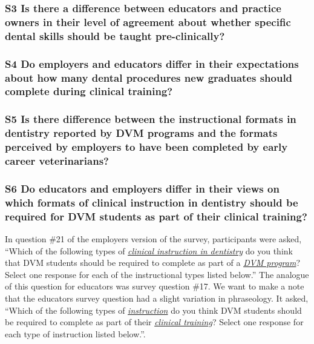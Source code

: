 \documentclass[
  11pt,
  letterpaper,
  DIV=11,
  numbers=noendperiod]{scrartcl}
\begin{document}
\subsubsection{S3 Is there a difference between educators and practice
owners in their level of agreement about whether specific dental skills
should be taught
pre-clinically?}\label{s3-is-there-a-difference-between-educators-and-practice-owners-in-their-level-of-agreement-about-whether-specific-dental-skills-should-be-taught-pre-clinically}

\subsubsection{S4 Do employers and educators differ in their
expectations about how many dental procedures new graduates should
complete during clinical
training?}\label{s4-do-employers-and-educators-differ-in-their-expectations-about-how-many-dental-procedures-new-graduates-should-complete-during-clinical-training}

\subsubsection{S5 Is there difference between the instructional formats
in dentistry reported by DVM programs and the formats perceived by
employers to have been completed by early career
veterinarians?}\label{s5-is-there-difference-between-the-instructional-formats-in-dentistry-reported-by-dvm-programs-and-the-formats-perceived-by-employers-to-have-been-completed-by-early-career-veterinarians}

\subsubsection{S6 Do educators and employers differ in their views on
which formats of clinical instruction in dentistry should be required
for DVM students as part of their clinical
training?}\label{s6-do-educators-and-employers-differ-in-their-views-on-which-formats-of-clinical-instruction-in-dentistry-should-be-required-for-dvm-students-as-part-of-their-clinical-training}

In question \#21 of the employers version of the survey, participants
were asked, ``Which of the following types of \ul{\emph{clinical
instruction in dentistry}} do you think that DVM students should be
required to complete as part of a \ul{\emph{DVM program}}? Select one
response for each of the instructional types listed below.'' The
analogue of this question for educators was survey question \#17. We
want to make a note that the educators survey question had a slight
variation in phraseology. It asked, ``Which of the following types of
\ul{\emph{instruction}} do you think DVM students should be required to
complete as part of their \ul{\emph{clinical training}}? Select one
response for each type of instruction listed below.''.
\end{document}
